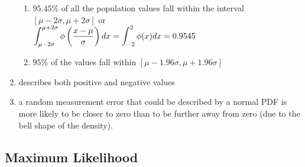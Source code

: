 \begin{enumerate}
\begin{enumerate}
        \item $95.45\%$ of all the population values fall within the interval $[\mu - 2\sigma, \mu + 2\sigma]$ or
        \hfill \cite{statistics/book/Statistics-for-Data-Scientists/Maurits-Kaptein}
        \\
        $
            \displaystyle\int_{\mu - 2\sigma}^{\mu + 2\sigma}
            \phi\left(\dfrac{x-\mu}{\sigma}\right) dx
            =
            \displaystyle\int_{-2}^{2}
            \phi(x) dx
            =
            0.9545
        $
        \hfill \cite{statistics/book/Statistics-for-Data-Scientists/Maurits-Kaptein}

        \item $95\%$ of the values fall within $[\mu - 1.96\sigma, \mu + 1.96\sigma]$
        \hfill \cite{statistics/book/Statistics-for-Data-Scientists/Maurits-Kaptein}
    \end{enumerate}

    \item  describes both positive and negative values
    \hfill \cite{statistics/book/Statistics-for-Data-Scientists/Maurits-Kaptein}

    \item a random measurement error that could be described by a normal PDF is more likely to be closer to zero than to be further away from zero (due to the bell shape of the density).
    \hfill \cite{statistics/book/Statistics-for-Data-Scientists/Maurits-Kaptein}
\end{enumerate}









\subsection{Maximum Likelihood}

